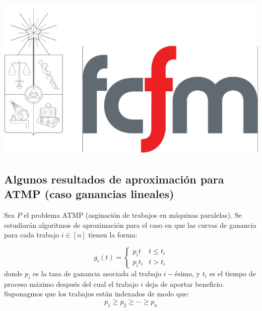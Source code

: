 \documentclass[10pt]{article}
\theoremstyle{plain}
\theoremstyle{definition}
\newcommand{\sca}{Escriba Uno}
\newcommand{\scb}{Escriba Dos}
\newcommand{\scc}{Escriba Tres}
\newcommand{\fecha}{5 de noviembre 2018 }
\begin{document}
\vspace*{-1.2 cm}
\begin{flushleft}
\includegraphics[scale=0.15]{fcfm}
\end{flushleft}
\bigskip


\subsection{Algunos resultados de aproximación para ATMP (caso ganancias lineales)}

Sea $P$ el problema ATMP (asginaci\'on de trabajos en m\'aquinas paralelas). Se estudiar\'an algoritmos de aproximaci\'on para el caso en que las curvas de ganancia para cada trabajo $i \in [n]$ tienen la forma:


$$
g_i(t) = \left\{\begin{array}{lr}
p_i t & t \leq t_i \\
p_i t_i & t>t_i
\end{array}\right.
$$
donde $p_i$ es la tasa de ganancia asociada al trabajo $i-$\'esimo, y $t_i$ es el tiempo de proceso m\'aximo despu\'es del cual el trabajo $i$ deja de aportar beneficio. Suponagmos que los trabajos est\'an indexados de modo que:
\begin{equation}
\label{eq:trabajosOrd}
p_1 \geq p_2 \geq \cdots \geq p_n
\end{equation}
\end{document}
